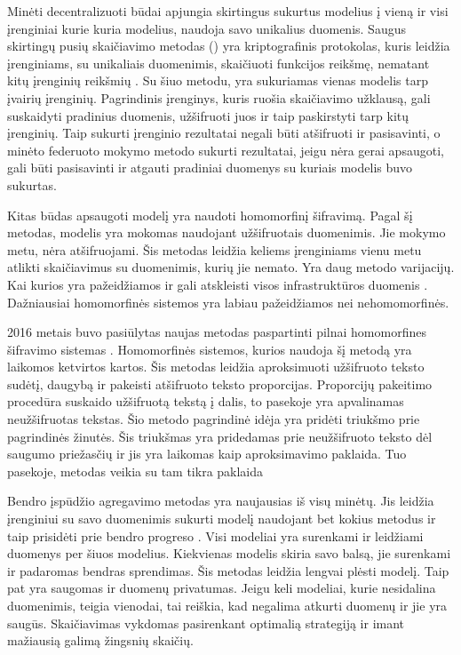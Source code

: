 \documentclass{VUMIFInfBakalaurinis}
\begin{document}
\par Minėti decentralizuoti būdai apjungia skirtingus sukurtus modelius į vieną ir visi įrenginiai kurie kuria modelius, naudoja savo unikalius duomenis. Saugus skirtingų pusių skaičiavimo metodas () yra kriptografinis protokolas, kuris leidžia įrenginiams, su unikaliais duomenimis, skaičiuoti funkcijos reikšmę, nematant kitų įrenginių reikšmių \cite{6}. Su šiuo metodu, yra sukuriamas vienas modelis tarp įvairių įrenginių. Pagrindinis įrenginys, kuris ruošia skaičiavimo užklausą, gali suskaidyti pradinius duomenis, užšifruoti juos ir taip paskirstyti tarp kitų įrenginių. Taip sukurti įrenginio rezultatai negali būti atšifruoti ir pasisavinti, o minėto federuoto mokymo metodo sukurti rezultatai, jeigu nėra gerai apsaugoti, gali būti pasisavinti ir atgauti pradiniai duomenys su kuriais modelis buvo sukurtas.
\par  Kitas būdas apsaugoti modelį yra naudoti homomorfinį šifravimą. Pagal šį metodas, modelis yra mokomas naudojant užšifruotais duomenimis. Jie mokymo metu, nėra atšifruojami. Šis metodas leidžia keliems įrenginiams vienu metu atlikti skaičiavimus su duomenimis, kurių jie nemato. Yra daug metodo varijacijų. Kai kurios yra pažeidžiamos ir gali atskleisti visos infrastruktūros duomenis \cite{7}. Dažniausiai homomorfinės sistemos yra labiau pažeidžiamos nei nehomomorfinės.
\par 2016 metais buvo pasiūlytas naujas metodas paspartinti pilnai homomorfines šifravimo sistemas \cite{8}. Homomorfinės sistemos, kurios naudoja šį metodą yra laikomos ketvirtos kartos. Šis metodas leidžia aproksimuoti užšifruoto teksto sudėtį, daugybą ir pakeisti atšifruoto teksto proporcijas. 
Proporcijų pakeitimo procedūra suskaido užšifruotą tekstą į dalis, to pasekoje yra apvalinamas neužšifruotas tekstas. Šio metodo pagrindinė idėja yra pridėti triukšmo prie pagrindinės žinutės. Šis triukšmas yra pridedamas prie neužšifruoto teksto dėl saugumo priežasčių ir jis yra laikomas kaip aproksimavimo paklaida. Tuo pasekoje, metodas veikia su tam tikra paklaida
\par Bendro įspūdžio agregavimo metodas yra naujausias iš visų minėtų. Jis leidžia įrenginiui su savo duomenimis sukurti modelį naudojant bet kokius metodus ir taip prisidėti prie bendro progreso \cite{6}. Visi modeliai yra surenkami ir leidžiami duomenys per šiuos modelius. Kiekvienas modelis skiria savo balsą, jie surenkami ir padaromas bendras sprendimas. Šis metodas leidžia lengvai plėsti modelį. Taip pat yra saugomas ir duomenų privatumas. Jeigu keli modeliai, kurie nesidalina duomenimis, teigia vienodai, tai reiškia, kad negalima atkurti duomenų ir jie yra saugūs. Skaičiavimas vykdomas pasirenkant optimalią strategiją ir imant mažiausią galimą žingsnių skaičių.
\end{document}
